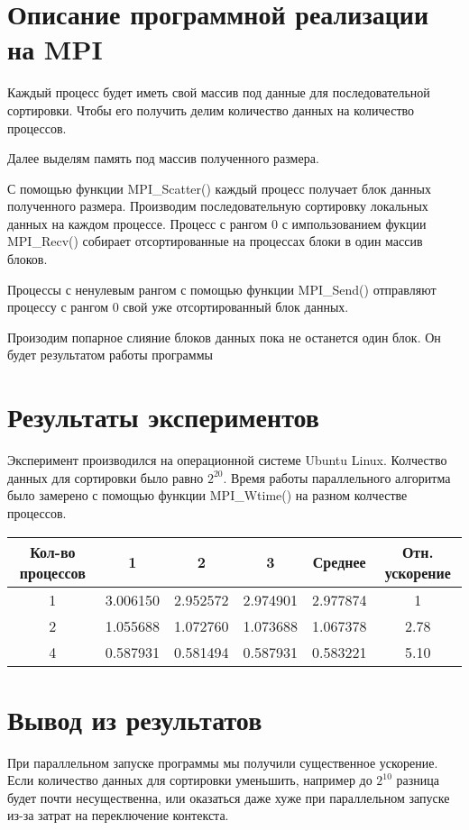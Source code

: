 \documentclass[oneside,final,14pt]{extreport}
\begin{document}
\chapter{Описание программной реализации на MPI}

Каждый процесс будет иметь свой массив под данные для последовательной сортировки. Чтобы его получить делим количество данных на количество процессов.
\bigskip

Далее выделям память под массив полученного размера.
\bigskip

С помощью функции MPI\_Scatter() каждый процесс получает блок данных полученного размера.
\bigskip
Производим последовательную сортировку локальных данных на каждом процессе.
\bigskip
Процесс с рангом \(0\) с импользованием фукции MPI\_Recv() собирает отсортированные на процессах блоки в один массив блоков.

Процессы с ненулевым рангом с помощью функции MPI\_Send() отправляют процессу с рангом \(0\) свой уже отсортированный блок данных.
\bigskip

Произодим попарное слияние блоков данных пока не останется один блок. Он будет результатом работы программы

\chapter{Результаты экспериментов}

Эксперимент производился на операционной системе Ubuntu Linux. Колчество данных для сортировки было равно \(2^{20}\). Время работы параллельного алгоритма было замерено с помощью функции MPI\_Wtime() на разном колчестве процессов.
\begin{center}
    \begin{tabular}{|c||c|c|c||c|c|} \hline
        Кол-во процессов & 1  & 2  & 3  & Среднее & Отн. ускорение \\ \hline \hline
        1 & 3.006150 & 2.952572 & 2.974901 & 2.977874 & 1 \\ \hline
        2 & 1.055688 & 1.072760 & 1.073688 & 1.067378 & 2.78 \\ \hline
        4 & 0.587931 & 0.581494 & 0.587931 & 0.583221 & 5.10 \\ \hline
    \end{tabular}   
\end{center}
\chapter{Вывод из результатов}
При параллельном запуске программы мы получили существенное ускорение. Если количество данных для сортировки уменьшить, например до \(2^{10}\) разница будет почти несущественна, или оказаться даже хуже при параллельном запуске из-за затрат на переключение контекста.
\end{document}
